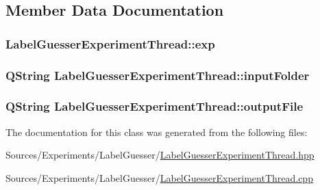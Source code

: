 \subsection{Member Data Documentation}
\hypertarget{class_label_guesser_experiment_thread_ab6ed283c5b4ae8272dc1a2fb872ce4bd}{
\subsubsection[{exp}]{ Label\+Guesser\+Experiment\+Thread\+::exp\hspace{0.3cm}{\ttfamily [private]}}}\label{class_label_guesser_experiment_thread_ab6ed283c5b4ae8272dc1a2fb872ce4bd}
\hypertarget{class_label_guesser_experiment_thread_a4b4ae486ed39a8503d4a30898bab7134}{
\subsubsection[{input\+Folder}]{\setlength{\rightskip}{0pt plus 5cm}Q\+String Label\+Guesser\+Experiment\+Thread\+::input\+Folder\hspace{0.3cm}{\ttfamily [private]}}}\label{class_label_guesser_experiment_thread_a4b4ae486ed39a8503d4a30898bab7134}
\hypertarget{class_label_guesser_experiment_thread_a1fb47063f7328e9497216864ce95c51d}{
\subsubsection[{output\+File}]{\setlength{\rightskip}{0pt plus 5cm}Q\+String Label\+Guesser\+Experiment\+Thread\+::output\+File\hspace{0.3cm}{\ttfamily [private]}}}\label{class_label_guesser_experiment_thread_a1fb47063f7328e9497216864ce95c51d}


The documentation for this class was generated from the following files\+:\begin{DoxyCompactItemize}
\item 
Sources/\+Experiments/\+Label\+Guesser/\hyperlink{_label_guesser_experiment_thread_8hpp}{Label\+Guesser\+Experiment\+Thread.\+hpp}\item 
Sources/\+Experiments/\+Label\+Guesser/\hyperlink{_label_guesser_experiment_thread_8cpp}{Label\+Guesser\+Experiment\+Thread.\+cpp}\end{DoxyCompactItemize}
